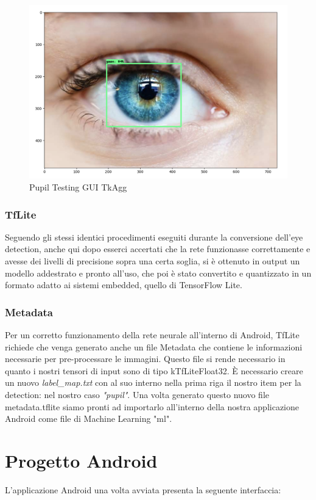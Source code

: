 \documentclass[11pt]{article}
\begin{document}
\begin{figure}[h]
\caption{Pupil Testing GUI TkAgg }
\centering
\includegraphics[scale=0.18]{img/pupilla.png}
\end{figure}

\subsubsection{TfLite}
Seguendo gli stessi identici procedimenti eseguiti durante la conversione dell'eye detection, anche qui dopo esserci accertati che la rete funzionasse correttamente e avesse dei livelli di precisione sopra una certa soglia, si è ottenuto in output un modello addestrato
e pronto all’uso, che poi è stato convertito e quantizzato in un formato adatto ai sistemi embedded, quello di TensorFlow Lite.
\subsubsection{Metadata}
Per un corretto funzionamento della rete neurale all'interno di Android, TfLite richiede che venga generato anche un file Metadata che contiene le informazioni necessarie per pre-processare le immagini. Questo file si rende necessario in quanto i nostri tensori di input sono di tipo kTfLiteFloat32. È necessario creare un nuovo \textit{label\_map.txt} con al suo interno nella prima riga il nostro item per la detection: nel nostro caso \textit{"pupil"}.
\newline
Una volta generato questo nuovo file metadata.tflite siamo pronti ad importarlo all'interno della nostra applicazione Android come file di Machine Learning "ml".

\newpage
\section{Progetto Android}
L'applicazione Android una volta avviata presenta la seguente interfaccia:
\end{document}
